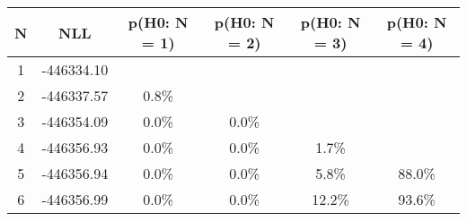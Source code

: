 \begin{table}[htb]
	\begin{center}
{\footnotesize\renewcommand{\arraystretch}{1.4}
		\begin{tabular}{cc||cccc}
			N & NLL & p(H0: N = 1) & p(H0: N = 2) & p(H0: N = 3) & p(H0: N = 4)\\ 
		\hline
1 & -446334.10 & & & & \\
2 & -446337.57 & 0.8\% & & & \\
3 & -446354.09 & 0.0\% & 0.0\% & & \\
4 & -446356.93 & 0.0\% & 0.0\% & 1.7\% & \\
5 & -446356.94 & 0.0\% & 0.0\% & 5.8\% & 88.0\% \\
6 & -446356.99 & 0.0\% & 0.0\% & 12.2\% & 93.6\% \\
	\end{tabular}
		\label{tab:lab}
	}
	\end{center}\end{table}

